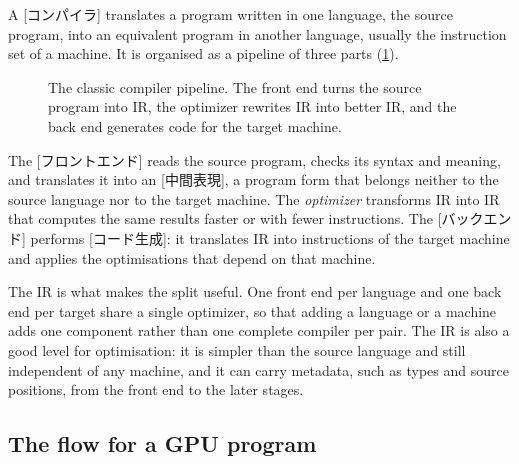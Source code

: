\documentclass[../main.tex]{subfiles}
\begin{document}
A [コンパイラ] translates a program written in one
language, the source program, into an equivalent program in another
language, usually the instruction set of a machine.  It is organised as a pipeline of three parts
(\cref{fig:l10-compile-flow}).

\begin{figure}[tb]
  \centering
  
  \caption{The classic compiler pipeline.  The front end turns the
    source program into IR, the optimizer rewrites IR into better IR,
    and the back end generates code for the target machine.}
  \label{fig:l10-compile-flow}
\end{figure}

\begin{definition}
  The [フロントエンド] reads the source program, checks
  its syntax and meaning, and translates it into an
  [中間表現], a program form
  that belongs neither to the source language nor to the
  target machine.%
    The
  \emph{optimizer} transforms IR into IR that computes the same results
  faster or with fewer instructions.  The
  [バックエンド] performs
  [コード生成]: it translates IR into
  instructions of the target machine and applies the optimisations that
  depend on that machine.
\end{definition}

The IR is what makes the split useful.  One front end per language and
one back end per target share a single optimizer, so that adding a
language or a machine adds one component rather than one complete
compiler per pair.  The IR is also a good level for optimisation:
it is simpler than the source language and still independent of any
machine, and it can carry metadata, such as types and source
positions, from the front end to the later stages.

\subsection{The flow for a GPU program}
\end{document}
